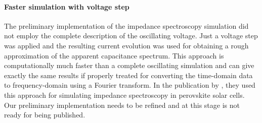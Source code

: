\begin{figure}
\end{figure}

\paragraph{Faster simulation with voltage step}
The preliminary implementation of the impedance spectroscopy simulation did not employ the complete description of the oscillating voltage.
Just a voltage step was applied and the resulting current evolution was used for obtaining a rough approximation of the apparent capacitance spectrum.
This approach is computationally much faster than a complete oscillating simulation and can give exactly the same results if properly treated for converting the time\hyp{}domain data to frequency\hyp{}domain using a Fourier transform.
In the publication by , they used this approach for simulating impedance spectroscopy in perovskite solar cells.
Our preliminary implementation needs to be refined and at this stage is not ready for being published.

